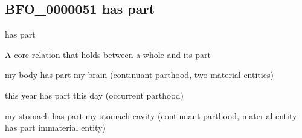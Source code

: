 \documentclass[letterpaper,10pt,english]{sphinxmanual}
\begin{document}
\begin{sphinxShadowBox}

\sphinxAtStartPar
{}
\end{sphinxShadowBox}

\begin{sphinxShadowBox}

\sphinxAtStartPar
{}

\sphinxAtStartPar
{}

\sphinxAtStartPar
{}
\end{sphinxShadowBox}
\begin{quote}

\ignorespaces \end{quote}


\subsection{BFO\_0000051 \sphinxhyphen{} has part}
\label{\detokenize{doc-BFO_0000051:bfo-0000051-has-part}}\label{\detokenize{doc-BFO_0000051:index-0}}\label{\detokenize{doc-BFO_0000051::doc}}
\begin{sphinxShadowBox}

\sphinxAtStartPar
has part
\end{sphinxShadowBox}

\begin{sphinxShadowBox}

\sphinxAtStartPar
{\hyperref[\detokenize{doc-RO_0002131::doc}]{}}
\end{sphinxShadowBox}

\begin{sphinxShadowBox}

\sphinxAtStartPar
A core relation that holds between a whole and its part
\end{sphinxShadowBox}

\begin{sphinxShadowBox}

\sphinxAtStartPar
my body has part my brain (continuant parthood, two material entities)

\sphinxAtStartPar
this year has part this day (occurrent parthood)

\sphinxAtStartPar
my stomach has part my stomach cavity (continuant parthood, material entity has part immaterial entity)
\end{sphinxShadowBox}
\end{document}

